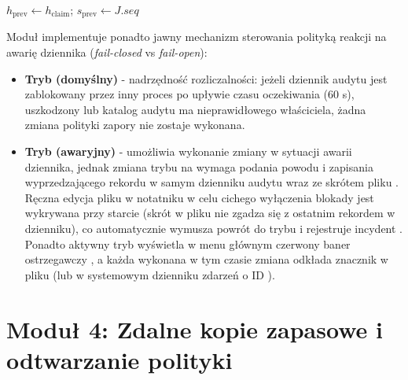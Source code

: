 \begin{algorithm}[H]
{        
        $h_{\text{prev}} \leftarrow h_{\text{claim}}$; $s_{\text{prev}} \leftarrow J.\mathit{seq}$\;
    }
    \;
\end{algorithm}

Moduł implementuje ponadto jawny mechanizm sterowania polityką reakcji na awarię dziennika (\textit{fail-closed} vs \textit{fail-open}):
\begin{itemize}
    \item \textbf{Tryb  (domyślny)} - nadrzędność rozliczalności: jeżeli dziennik audytu jest zablokowany przez inny proces po upływie czasu oczekiwania (60 s), uszkodzony lub katalog audytu ma nieprawidłowego właściciela, żadna zmiana polityki zapory nie zostaje wykonana.
    \item \textbf{Tryb  (awaryjny)} - umożliwia wykonanie zmiany w sytuacji awarii dziennika, jednak zmiana trybu na  wymaga podania powodu i zapisania wyprzedzającego rekordu  w samym dzienniku audytu wraz ze skrótem pliku . Ręczna edycja pliku  w notatniku w celu cichego wyłączenia blokady jest wykrywana przy starcie (skrót w pliku nie zgadza się z ostatnim rekordem  w dzienniku), co automatycznie wymusza powrót do trybu  i rejestruje incydent . Ponadto aktywny tryb  wyświetla w menu głównym czerwony baner ostrzegawczy , a każda wykonana w tym czasie zmiana odkłada znacznik w pliku  (lub w systemowym dzienniku zdarzeń  o ID ).
\end{itemize}

\section{Moduł 4: Zdalne kopie zapasowe i odtwarzanie polityki}\label{sec:modul-backup}

